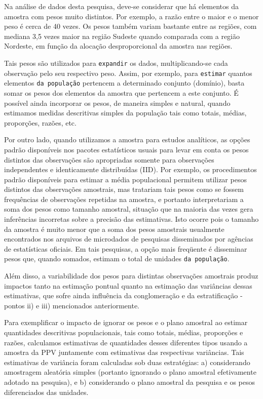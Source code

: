 \documentclass[]{book}
\theoremstyle{definition}
\theoremstyle{definition}
\theoremstyle{definition}
\theoremstyle{remark}
\begin{document}
Na análise de dados desta pesquisa, deve-se considerar que há elementos
da amostra com pesos muito distintos. Por exemplo, a razão entre o maior
e o menor peso é cerca de 40 vezes. Os pesos também variam bastante
entre as regiões, com mediana 3,5 vezes maior na região Sudeste quando
comparada com a região Nordeste, em função da alocação desproporcional
da amostra nas regiões.

Tais pesos são utilizados para \texttt{expandir} os dados,
multiplicando-se cada observação pelo seu respectivo peso. Assim, por
exemplo, para \texttt{estimar} quantos elementos \texttt{da\ população}
pertencem a determinado conjunto (domínio), basta somar os pesos dos
elementos da amostra que pertencem a este conjunto. É possível ainda
incorporar os pesos, de maneira simples e natural, quando estimamos
medidas descritivas simples da população tais como totais, médias,
proporções, razões, etc.

Por outro lado, quando utilizamos a amostra para estudos analíticos, as
opções padrão disponíveis nos pacotes estatísticos usuais para levar em
conta os pesos distintos das observações são apropriadas somente para
observações independentes e identicamente distribuídas (IID). Por
exemplo, os procedimentos padrão disponíveis para estimar a média
populacional permitem utilizar pesos distintos das observações
amostrais, mas tratariam tais pesos como se fossem frequências de
observações repetidas na amostra, e portanto interpretariam a soma dos
pesos como tamanho amostral, situação que na maioria das vezes gera
inferências incorretas sobre a precisão das estimativas. Isto ocorre
pois o tamanho da amostra é muito menor que a soma dos pesos amostrais
usualmente encontrados nos arquivos de microdados de pesquisas
disseminados por agências de estatísticas oficiais. Em tais pesquisas, a
opção mais freqüente é disseminar pesos que, quando somados, estimam o
total de unidades \texttt{da\ população}.

Além disso, a variabilidade dos pesos para distintas observações
amostrais produz impactos tanto na estimação pontual quanto na estimação
das variâncias dessas estimativas, que sofre ainda influência da
conglomeração e da estratificação - pontos ii) e iii) mencionados
anteriormente.

Para exemplificar o impacto de ignorar os pesos e o plano amostral ao
estimar quantidades descritivas populacionais, tais como totais, médias,
proporções e razões, calculamos estimativas de quantidades desses
diferentes tipos usando a amostra da PPV juntamente com estimativas das
respectivas variâncias. Tais estimativas de variância foram calculadas
sob duas estratégias: a) considerando amostragem aleatória simples
(portanto ignorando o plano amostral efetivamente adotado na pesquisa),
e b) considerando o plano amostral da pesquisa e os pesos diferenciados
das unidades.
\end{document}

